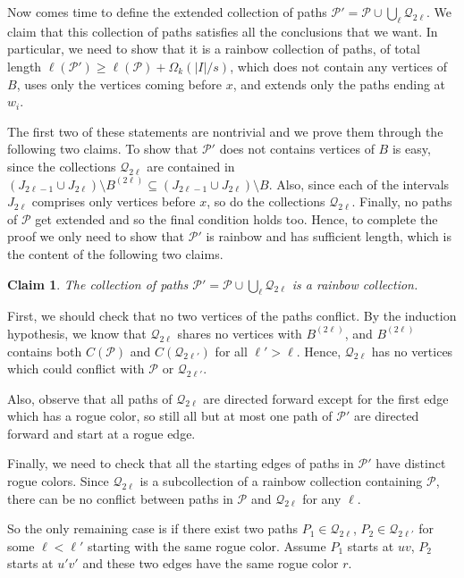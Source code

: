 \documentclass[a4paper,11pt]{article}
\makeatletter
\renewenvironment{proof}[1][\proofname] {\par\pushQED{\qed}\normalfont\topsep6\p@\@plus6\p@\relax\trivlist\item[\hskip\labelsep\bfseries#1\@addpunct{.}]\ignorespaces}{\popQED\endtrivlist\@endpefalse}
\newtheorem{claim}[theorem]{\bf Claim}
\theoremstyle{definition}
\def\cP{\mathcal{P}}
\def\cQ{\mathcal{Q}}
\makeatother
\begin{document}
\begin{proof}
Now comes time to define the extended collection of paths $\cP'=\cP\cup \bigcup_{\ell}\cQ_{2\ell}$. We claim that this collection of paths satisfies all the conclusions that we want. In particular, we need to show that it is a rainbow collection of paths, of total length $\ell(\cP')\geq \ell(\cP)+\Omega_k(|I|/s)$, which does not contain any vertices of $B$, uses only the vertices coming before $x$, and extends only the paths ending at $w_i$. 

The first two of these statements are nontrivial and we prove them through the following two claims. To show that $\cP'$ does not contains vertices of $B$ is easy, since the collections $\cQ_{2\ell}$ are contained in $(J_{2\ell-1}\cup J_{2\ell})\setminus B^{(2\ell)}\subseteq (J_{2\ell-1}\cup J_{2\ell})\setminus B$. Also, since each of the intervals $J_{2\ell}$ comprises only vertices before $x$, so do the collections $\cQ_{2\ell}$. Finally, no paths of $\cP$ get extended and so the final condition holds too. Hence, to complete the proof we only need to show that $\cP'$ is rainbow and has sufficient length, which is the content of the following two claims.

\begin{claim}\label{claim:final sequence is rainbow}
The collection of paths $\cP'=\cP\cup \bigcup_{\ell}\cQ_{2\ell}$ is a rainbow collection.
\end{claim}
\begin{proof}
First, we should check that no two vertices of the paths conflict. By the induction hypothesis, we know that $\cQ_{2\ell}$ shares no vertices with $B^{(2\ell)}$, and $B^{(2\ell)}$ contains both $C(\cP)$ and $C(\cQ_{2\ell'})$ for all $\ell'>\ell$. Hence, $\cQ_{2\ell}$ has no vertices which could conflict with $\cP$ or $\cQ_{2\ell'}$. 

Also, observe that all paths of $\cQ_{2\ell}$ are directed forward except for the first edge which has a rogue color, so still all but at most one path of $\cP'$ are directed forward and start at a rogue edge.

Finally, we need to check that all the starting edges of paths in $\cP'$ have distinct rogue colors. Since $\cQ_{2\ell}$ is a subcollection of a rainbow collection containing $\cP$, there can be no conflict between paths in $\cP$ and $\cQ_{2\ell}$ for any $\ell$.

So the only remaining case is if there exist two paths $P_1\in\cQ_{2\ell}$, $P_2\in \cQ_{2\ell'}$ for some $\ell<\ell'$ starting with the same rogue color. Assume $P_1$ starts at $uv$, $P_2$ starts at $u'v'$ and these two edges have the same rogue color $r$. 


\end{proof}
\end{proof}
\end{document}
